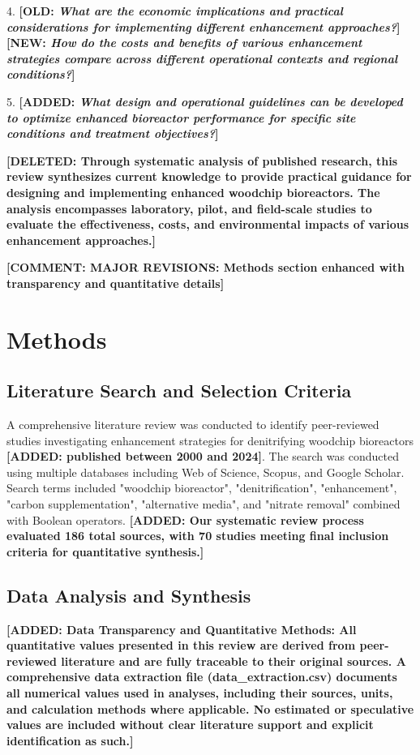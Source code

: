 \documentclass[12pt,a4paper]{article}
\newcommand{\added}[1]{\textcolor{addedtext}{\textbf{[ADDED: #1]}}}
\newcommand{\deleted}[1]{\textcolor{deletedtext}{\textbf{[DELETED: #1]}}}
\newcommand{\replaced}[2]{\textcolor{deletedtext}{\textbf{[OLD: #1]}} \textcolor{replacedtext}{\textbf{[NEW: #2]}}}
\newcommand{\comment}[1]{\textcolor{commenttext}{\textbf{[COMMENT: #1]}}}
\begin{document}
4. \replaced{\textit{What are the economic implications and practical considerations for implementing different enhancement approaches?}}{\textit{How do the costs and benefits of various enhancement strategies compare across different operational contexts and regional conditions?}}

5. \added{\textit{What design and operational guidelines can be developed to optimize enhanced bioreactor performance for specific site conditions and treatment objectives?}}

\deleted{Through systematic analysis of published research, this review synthesizes current knowledge to provide practical guidance for designing and implementing enhanced woodchip bioreactors. The analysis encompasses laboratory, pilot, and field-scale studies to evaluate the effectiveness, costs, and environmental impacts of various enhancement approaches.}

\comment{MAJOR REVISIONS: Methods section enhanced with transparency and quantitative details}

\section{Methods}

\subsection{Literature Search and Selection Criteria}

A comprehensive literature review was conducted to identify peer-reviewed studies investigating enhancement strategies for denitrifying woodchip bioreactors \added{published between 2000 and 2024}. The search was conducted using multiple databases including Web of Science, Scopus, and Google Scholar. Search terms included "woodchip bioreactor", "denitrification", "enhancement", "carbon supplementation", "alternative media", and "nitrate removal" combined with Boolean operators. \added{Our systematic review process evaluated 186 total sources, with 70 studies meeting final inclusion criteria for quantitative synthesis.}

\subsection{Data Analysis and Synthesis}

\added{Data Transparency and Quantitative Methods: All quantitative values presented in this review are derived from peer-reviewed literature and are fully traceable to their original sources. A comprehensive data extraction file (data\_extraction.csv) documents all numerical values used in analyses, including their sources, units, and calculation methods where applicable. No estimated or speculative values are included without clear literature support and explicit identification as such.}
\end{document}

